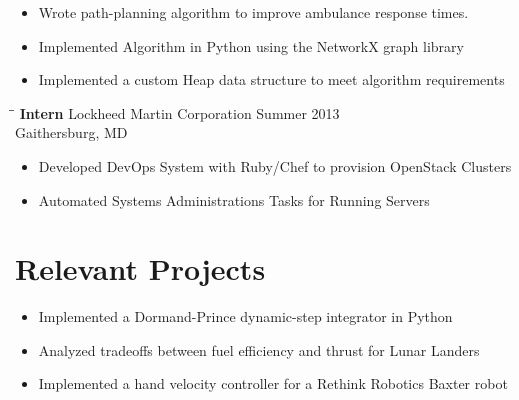 \documentclass[12pt]{res}
\begin{document}
\begin{resume}
	\vspace{-40pt}
	\begin{itemize}
	\item Wrote path-planning algorithm to improve ambulance response times.
	\vspace{-10pt}
	\item Implemented Algorithm in Python using the NetworkX graph library
	\vspace{-10pt}
	\item Implemented a custom Heap data structure to meet algorithm requirements
	\end{itemize}
    
    \vspace{-10pt}
    \begin{tabbing}
    \hspace{2.3in}\= \hspace{2.6in}\= \kill %
    \textbf{ Intern } \> Lockheed Martin Corporation \> Summer 2013\\
                  \> Gaithersburg, MD
    \end{tabbing}\vspace{-10pt}

	\vspace{-15pt}
	\begin{itemize}
	\item Developed DevOps System with Ruby/Chef to provision 
		OpenStack Clusters
	\vspace{-10pt} 
	\item Automated Systems Administrations Tasks for Running Servers
	\end{itemize}

  \vspace{-15pt}
  \section{Relevant Projects}
	\vspace{0pt}
	\begin{itemize}
	\item Implemented a Dormand-Prince dynamic-step integrator
		in Python
	\vspace{-10pt}
	\item Analyzed tradeoffs between fuel efficiency and thrust for
		Lunar Landers	
	\vspace{-10pt}
	\item Implemented a hand velocity controller for a Rethink Robotics
		Baxter robot
	\end{itemize}


\end{resume}
\end{document}
